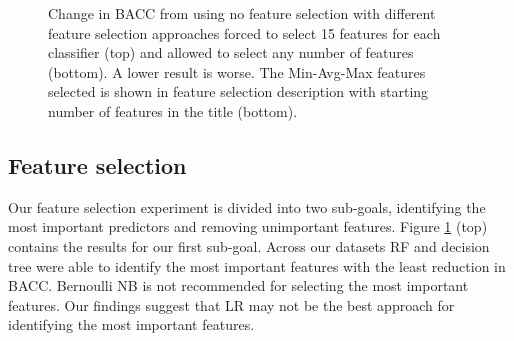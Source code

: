 \documentclass{sig-alternate-05-2015}
\begin{document}
	\begin{figure}
		\vspace{-5em}
		\centering
		\caption{Change in BACC from using no feature selection with different feature selection approaches forced to select 15 features for each classifier (top) and allowed to select any number of features (bottom). A lower result is worse. The Min-Avg-Max features selected is shown in feature selection description with starting number of features in the title (bottom). }
		\label{fig:feature_selection_limit_15}
		\vspace{-1.5em}
	\end{figure}
	
	
	\subsection{Feature selection}
	Our feature selection experiment is divided into two sub-goals, identifying the most important predictors and removing unimportant features. Figure \ref{fig:feature_selection_limit_15} (top) contains the results for our first sub-goal. Across our datasets RF and decision tree were able to identify the most important features with the least reduction in BACC. Bernoulli NB is not recommended for selecting the most important features. Our findings suggest that LR may not be the best approach for identifying the most important features.
	
\end{document}
